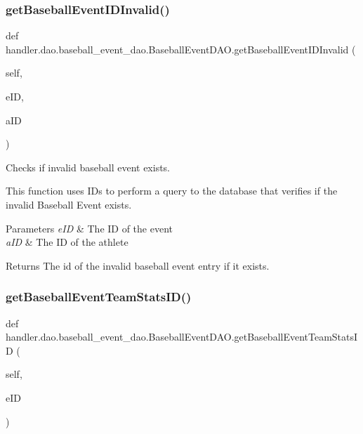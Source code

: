 \subsubsection{\texorpdfstring{get\+Baseball\+Event\+I\+D\+Invalid()}{getBaseballEventIDInvalid()}}
{\footnotesize\ttfamily def handler.\+dao.\+baseball\+\_\+event\+\_\+dao.\+Baseball\+Event\+D\+A\+O.\+get\+Baseball\+Event\+I\+D\+Invalid (\begin{DoxyParamCaption}\item[{}]{self,  }\item[{}]{e\+ID,  }\item[{}]{a\+ID }\end{DoxyParamCaption})}



Checks if invalid baseball event exists. 

This function uses I\+Ds to perform a query to the database that verifies if the invalid Baseball Event exists.


\begin{DoxyParams}{Parameters}
{\em e\+ID} & The ID of the event \\
\hline
{\em a\+ID} & The ID of the athlete\\
\hline
\end{DoxyParams}
\begin{DoxyReturn}{Returns}
The id of the invalid baseball event entry if it exists. 
\end{DoxyReturn}
\mbox{\label{classhandler_1_1dao_1_1baseball__event__dao_1_1_baseball_event_d_a_o_a27be92353deb42ef715531749e4202e2}} 
\subsubsection{\texorpdfstring{get\+Baseball\+Event\+Team\+Stats\+I\+D()}{getBaseballEventTeamStatsID()}}
{\footnotesize\ttfamily def handler.\+dao.\+baseball\+\_\+event\+\_\+dao.\+Baseball\+Event\+D\+A\+O.\+get\+Baseball\+Event\+Team\+Stats\+ID (\begin{DoxyParamCaption}\item[{}]{self,  }\item[{}]{e\+ID }\end{DoxyParamCaption})}



